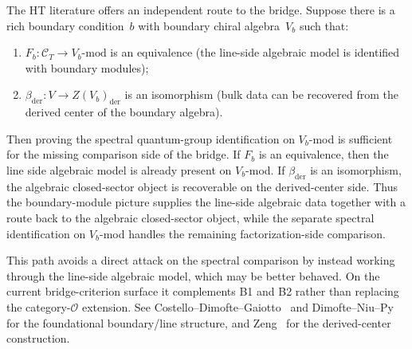 \begin{remark}
\label{rem:boundary-line-bridge-path}
The HT literature offers an independent route to the
bridge. Suppose there is a rich boundary condition~$b$ with
boundary chiral algebra~$V_b$ such that:
\begin{enumerate}[label=\textup{(\alph*)}]
\item $F_b \colon \mathcal{C}_T \to V_b\text{-mod}$ is an equivalence
 (the line-side algebraic model is identified with boundary modules);
\item $\beta_{\mathrm{der}} \colon V \to Z(V_b)_{\mathrm{der}}$
 is an isomorphism (bulk data can be recovered from the derived
 center of the boundary algebra).
\end{enumerate}
Then proving the spectral quantum-group identification on
$V_b$-mod is sufficient for the missing comparison
side of the bridge. If $F_b$ is an equivalence, then the line
side algebraic model is already present on $V_b$-mod.
If $\beta_{\mathrm{der}}$ is an isomorphism, the algebraic
closed-sector object is recoverable on the derived-center side. Thus the
boundary-module picture supplies the line-side algebraic data together
with a route back to the algebraic closed-sector object, while the
separate spectral identification on $V_b$-mod handles the remaining
factorization-side comparison.

This path avoids a direct attack on the spectral comparison by instead
working through the line-side algebraic model, which may be better
behaved. On the current bridge-criterion surface it complements B1
and B2 rather than replacing the category-$\mathcal{O}$ extension.
See Costello--Dimofte--Gaiotto~\cite{CDG2023} and
Dimofte--Niu--Py~\cite{DNP25} for the foundational
boundary/line structure, and Zeng~\cite{KZ2025} for the
derived-center construction.
\end{remark}

